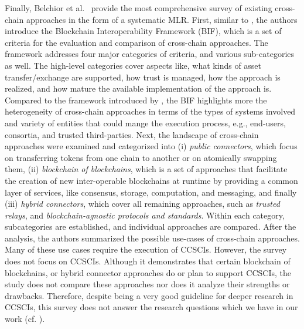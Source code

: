 \documentclass[review]{elsarticle}
\begin{document}
Finally, Belchior et al.~\cite{belchior2020survey} provide the most comprehensive survey of existing cross-chain approaches in the form of a systematic MLR.
First, similar to \cite{Koens2019Assessing}, the authors introduce the Blockchain Interoperability Framework (BIF), which is a set of criteria for the evaluation and comparison of cross-chain approaches.
The framework addresses four major categories of criteria, and various sub-categories as well.
The high-level categories cover aspects like, what kinds of asset transfer/exchange are supported, how trust is managed, how the approach is realized, and how mature the available implementation of the approach is.
Compared to the framework introduced by \cite{Koens2019Assessing}, the BIF highlights more the heterogeneity of cross-chain approaches in terms of the types of systems involved and variety of entities that could mange the execution process, e.g., end-users, consortia, and trusted third-parties.
Next, the landscape of cross-chain approaches were examined and categorized into (i) \textit{public connectors}, which focus on transferring tokens from one chain to another or on atomically swapping them, (ii) \textit{blockchain of blockchains}, which is a set of approaches that facilitate the creation of new inter-operable blockchains at runtime by providing a common layer of services, like consensus, storage, computation, and messaging, and finally (iii) \textit{hybrid connectors}, which cover all remaining approaches, such as \textit{trusted relays}, and \textit{blockchain-agnostic protocols and standards}.
Within each category, subcategories are established, and individual approaches are compared.
After the analysis, the authors summarized the possible use-cases of cross-chain approaches.
Many of these use cases require the execution of CCSCIs. 
However, the survey does not focus on CCSCIs.
Although it demonstrates that certain blockchain of blockchains, or hybrid connector approaches do or plan to support CCSCIs, the study does not compare these approaches nor does it analyze their strengths or drawbacks.
Therefore, despite being a very good guideline for deeper research in CCSCIs, this survey does not answer the research questions which we have in our work (cf. ).
\end{document}
